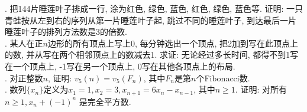 \documentclass[10pt,twocolumn,letterpaper]{article}
\title{}
\author{}
\theoremstyle{mythmstyle}
\begin{document}
\large
{}. 把144片睡莲叶子排成一行, 涂为红色, 绿色, 蓝色, 红色, 绿色, 蓝色等. 证明: 一只青蛙按从左到右的序列从第一片睡莲叶子起, 跳过不同的睡莲叶子, 到达最后一片睡莲叶子的排列方法数是3的倍数.\\

. 某人在正$n$边形的所有顶点上写上0, 每分钟选出一个顶点, 把2加到写在此顶点上的数, 并从写在两个相邻顶点上的数减去1. 求证: 无论经过多长时间, 都得不到1写在一个顶点上, -1写在另一个顶点上, 0写在其他各顶点上的布局.\\

. 对正整数$n$, 证明: $v_5(n) = v_5(F_n)$, 其中$F_n$是第$n$个Fibonacci数.\\

. 数列$\{x_n\}$定义为$x_1 = 1, x_2 = 3, x_{n+1} = 6x_{n} - x_{n-1}$, 其中$n \geq 1$. 证明: 对所有$n \geq 1, x_n + (-1)^n$ 是完全平方数.\\
\end{document}
